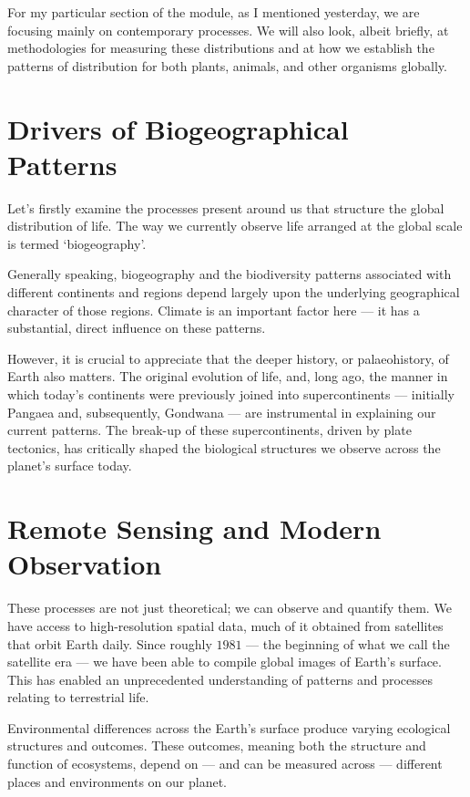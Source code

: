 \documentclass[
  12pt,
]{book}
\begin{document}
For my particular section of the module, as I mentioned yesterday, we
are focusing mainly on contemporary processes. We will also look, albeit
briefly, at methodologies for measuring these distributions and at how
we establish the patterns of distribution for both plants, animals, and
other organisms globally.

\section{Drivers of Biogeographical
Patterns}\label{drivers-of-biogeographical-patterns}

Let's firstly examine the processes present around us that structure the
global distribution of life. The way we currently observe life arranged
at the global scale is termed `biogeography'.

Generally speaking, biogeography and the biodiversity patterns
associated with different continents and regions depend largely upon the
underlying geographical character of those regions. Climate is an
important factor here --- it has a substantial, direct influence on
these patterns.

However, it is crucial to appreciate that the deeper history, or
palaeohistory, of Earth also matters. The original evolution of life,
and, long ago, the manner in which today's continents were previously
joined into supercontinents --- initially Pangaea and, subsequently,
Gondwana --- are instrumental in explaining our current patterns. The
break-up of these supercontinents, driven by plate tectonics, has
critically shaped the biological structures we observe across the
planet's surface today.

\section{Remote Sensing and Modern
Observation}\label{remote-sensing-and-modern-observation}

These processes are not just theoretical; we can observe and quantify
them. We have access to high-resolution spatial data, much of it
obtained from satellites that orbit Earth daily. Since roughly \(1981\)
--- the beginning of what we call the satellite era --- we have been
able to compile global images of Earth's surface. This has enabled an
unprecedented understanding of patterns and processes relating to
terrestrial life.

Environmental differences across the Earth's surface produce varying
ecological structures and outcomes. These outcomes, meaning both the
structure and function of ecosystems, depend on --- and can be measured
across --- different places and environments on our planet.
\end{document}
